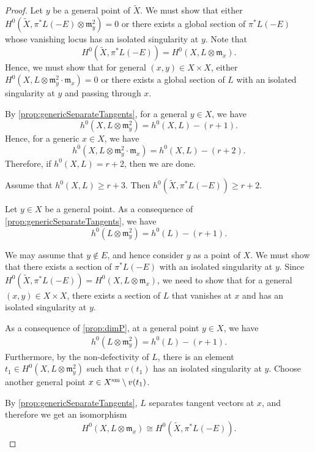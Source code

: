 \documentclass[11pt,reqno]{amsart}
\theoremstyle{plain}
\theoremstyle{definition}
\theoremstyle{remark}
\numberwithin{equation}{section}
\numberwithin{equation}{section}
\begin{document}
\begin{proof}
  Let $y$ be a general point of $\widetilde X$.
  We must show that either $H^0(\widetilde X, \pi^* L(-E) \otimes \mathfrak m_y^2) = 0$ or there exists a global section of $\pi^*L(-E)$ whose vanishing locus has an isolated singularity at $y$.
  Note that
  \[ H^0(\widetilde X, \pi^*L(-E)) = H^0(X, L \otimes \mathfrak m_x).\]
  Hence, we must show that for general $(x,y) \in X \times X$, either $H^0(X, L \otimes \mathfrak m_y^2 \cdot \mathfrak m_x) = 0$ or there exists a global section of $L$ with an isolated singularity at $y$ and passing through $x$.

  By \autoref{prop:genericSeparateTangents}, for a general $y \in X$, we have
  \[ h^0(X, L \otimes \mathfrak m_y^2) = h^0(X, L) - (r+1).\]
  Hence, for a generic $x \in X$, we have
  \[ h^0(X, L \otimes \mathfrak m_y^2\cdot \mathfrak m_x) = h^0(X, L) - (r+2).\]
  Therefore, if $h^0(X, L) = r+2$, then we are done.

  Assume that $h^0(X, L) \geq r+3$.
  Then $h^0(\widetilde X, \pi^*L(-E)) \geq r+2$.
  
  
  Let $y \in X$ be a general point.
  As a consequence of \autoref{prop:genericSeparateTangents}, we have
  \[ h^0(L \otimes \mathfrak m_y^2) = h^0(L) - (r+1).\]
  
  

  We may assume that $y \not \in E$, and hence consider $y$ as a point of $X$.
  We must show that there exists a section of $\pi^*L(-E)$ with an isolated singularity at $y$.
  Since $H^0(\widetilde X, \pi^*L(-E)) = H^0(X, L \otimes \mathfrak m_x)$, we need to show that for a general $(x,y) \in X \times X$, there exists a section of $L$ that vanishes at $x$ and has an isolated singularity at $y$.


  
 As a consequence of \autoref{prop:dimP}, at a general point $y \in X$, we have
  \begin{align*}
    h^{0}(L \otimes {\mathfrak{m}^{2}_{y}}) = h^{0}(L) - (r+1).
  \end{align*}
  Furthermore, by the non-defectivity of $L$, there is an element $t_{1} \in H^{0}(X, L \otimes {\mathfrak{m}^{2}_{y}})$ such that $v(t_{1})$ has an isolated singularity at $y$.
  Choose another general point $x \in X^{\rm sm} \setminus v(t_1)$.
  
  By \autoref{prop:genericSeparateTangents}, $L$ separates tangent vectors at  $x$, and therefore we get an isomorphism
  \[H^{0}(X, L \otimes {\mathfrak m}_{x}) \cong H^{0}(\widetilde{X},\pi^{*}L(-E)).\]
 


\end{proof}
\end{document}

